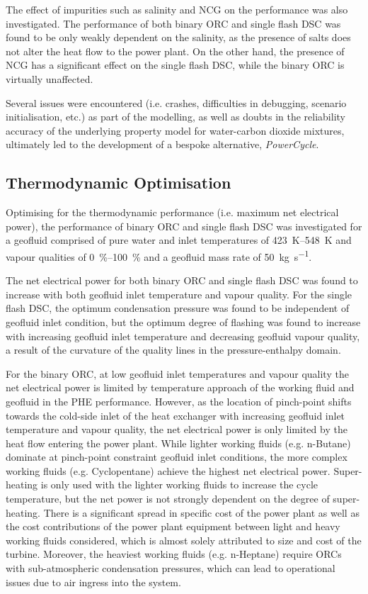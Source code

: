         The effect of impurities such as salinity and \ac{NCG} on the performance was also investigated. The performance of both binary \ac{ORC} and single flash \ac{DSC} was found to be only weakly dependent on the salinity, as the presence of salts does not alter the heat flow to the power plant. On the other hand, the presence of \ac{NCG} has a significant effect on the single flash \ac{DSC}, while the binary \ac{ORC} is virtually unaffected.

        Several issues were encountered (i.e. crashes, difficulties in debugging, scenario initialisation, etc.) as part of the modelling, as well as doubts in the reliability accuracy of the underlying property model for water-carbon dioxide mixtures, ultimately led to the development of a bespoke alternative, \emph{PowerCycle}. 
        
    \subsection{Thermodynamic Optimisation}
        Optimising for the thermodynamic performance (i.e. maximum net electrical power), the performance of binary \ac{ORC} and single flash \ac{DSC} was investigated for a geofluid comprised of pure water and inlet temperatures of \qtyrange{423}{548}{\K} and vapour qualities of \qtyrange{0}{100}{\percent} and a geofluid mass rate of \qty{50}{\kg\per\s}.

        The net electrical power for both binary \ac{ORC} and single flash \ac{DSC} was found to increase with both geofluid inlet temperature and vapour quality. For the single flash \ac{DSC}, the optimum condensation pressure was found to be independent of geofluid inlet condition, but the optimum degree of flashing was found to increase with increasing geofluid inlet temperature and decreasing geofluid vapour quality, a result of the curvature of the quality lines in the pressure-enthalpy domain. 

        For the binary \ac{ORC}, at low geofluid inlet temperatures and vapour quality the net electrical power is limited by temperature approach of the working fluid and geofluid in the \ac{PHE} performance. However, as the location of  pinch-point shifts towards the cold-side inlet of the heat exchanger with increasing geofluid inlet temperature and vapour quality, the net electrical power is only limited by the heat flow entering the power plant. While lighter working fluids (e.g. n-Butane) dominate at pinch-point constraint geofluid inlet conditions, the more complex working fluids (e.g. Cyclopentane) achieve the highest net electrical power. Super-heating is only used with the lighter working fluids to increase the cycle temperature, but the net power is not strongly dependent on the degree of super-heating. There is a significant spread in specific cost of the power plant as well as the cost contributions of the power plant equipment between light and heavy working fluids considered, which is almost solely attributed to size and cost of the turbine. Moreover, the heaviest working fluids (e.g. n-Heptane) require \acp{ORC} with sub-atmospheric condensation pressures, which can lead to operational issues due to air ingress into the system.

